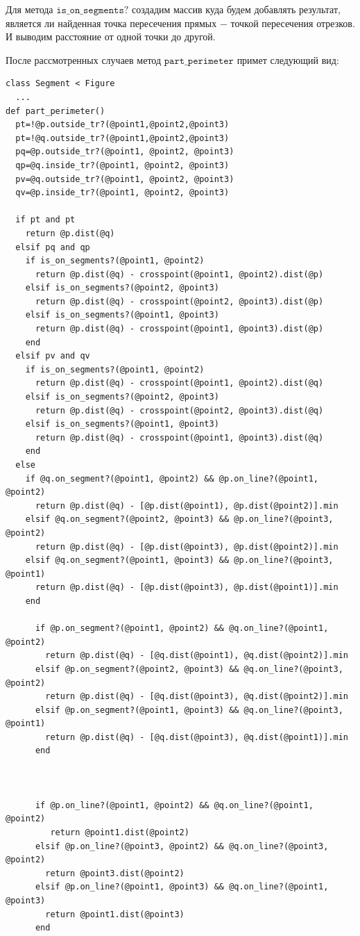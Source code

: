 Для метода $\texttt{is\_on\_segments?}$ создадим массив куда будем добавлять результат, является ли найденная точка 
пересечения прямых $-$ точкой пересечения отрезков.
И выводим расстояние от одной точки до другой. 

После рассмотренных случаев метод $\texttt{part\_perimeter}$ примет следующий вид:
\begin{small}
\begin{verbatim}
class Segment < Figure
  ...
def part_perimeter()
  pt=!@p.outside_tr?(@point1,@point2,@point3)
  pt=!@q.outside_tr?(@point1,@point2,@point3)
  pq=@p.outside_tr?(@point1, @point2, @point3)
  qp=@q.inside_tr?(@point1, @point2, @point3)
  pv=@q.outside_tr?(@point1, @point2, @point3)
  qv=@p.inside_tr?(@point1, @point2, @point3)
  
  if pt and pt
    return @p.dist(@q)                         
  elsif pq and qp
    if is_on_segments?(@point1, @point2) 
	  return @p.dist(@q) - crosspoint(@point1, @point2).dist(@p)
	elsif is_on_segments?(@point2, @point3)
	  return @p.dist(@q) - crosspoint(@point2, @point3).dist(@p) 
    elsif is_on_segments?(@point1, @point3)
	  return @p.dist(@q) - crosspoint(@point1, @point3).dist(@p)  
	end
  elsif pv and qv
    if is_on_segments?(@point1, @point2) 
	  return @p.dist(@q) - crosspoint(@point1, @point2).dist(@q) 
    elsif is_on_segments?(@point2, @point3)
	  return @p.dist(@q) - crosspoint(@point2, @point3).dist(@q) 
    elsif is_on_segments?(@point1, @point3)
	  return @p.dist(@q) - crosspoint(@point1, @point3).dist(@q) 
	end
  else
    if @q.on_segment?(@point1, @point2) && @p.on_line?(@point1, @point2)
      return @p.dist(@q) - [@p.dist(@point1), @p.dist(@point2)].min
    elsif @q.on_segment?(@point2, @point3) && @p.on_line?(@point3, @point2)
      return @p.dist(@q) - [@p.dist(@point3), @p.dist(@point2)].min
    elsif @q.on_segment?(@point1, @point3) && @p.on_line?(@point3, @point1)
      return @p.dist(@q) - [@p.dist(@point3), @p.dist(@point1)].min
    end
	  
      if @p.on_segment?(@point1, @point2) && @q.on_line?(@point1, @point2)
        return @p.dist(@q) - [@q.dist(@point1), @q.dist(@point2)].min
      elsif @p.on_segment?(@point2, @point3) && @q.on_line?(@point3, @point2)
        return @p.dist(@q) - [@q.dist(@point3), @q.dist(@point2)].min
      elsif @p.on_segment?(@point1, @point3) && @q.on_line?(@point3, @point1)
        return @p.dist(@q) - [@q.dist(@point3), @q.dist(@point1)].min
      end
	  
	  
	  
      if @p.on_line?(@point1, @point2) && @q.on_line?(@point1, @point2)
	     return @point1.dist(@point2) 
      elsif @p.on_line?(@point3, @point2) && @q.on_line?(@point3, @point2)
	    return @point3.dist(@point2) 
      elsif @p.on_line?(@point1, @point3) && @q.on_line?(@point1, @point3)
	    return @point1.dist(@point3) 
	  end
	  

\end{verbatim}
\end{small}
